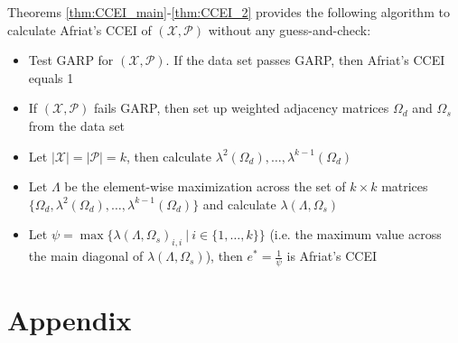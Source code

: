 \documentclass{article} %
\theoremstyle{style1}
\theoremstyle{style1}
\theoremstyle{example}
\begin{document}
Theorems \ref{thm:CCEI_main}-\ref{thm:CCEI_2} provides the following algorithm to calculate Afriat's CCEI of $(\mathcal{X},\mathcal{P})$ without any guess-and-check:
\begin{itemize}
  \item Test GARP for $(\mathcal{X},\mathcal{P})$. If the data set passes GARP, then Afriat's CCEI equals 1
  \item If $(\mathcal{X},\mathcal{P})$ fails GARP, then set up weighted adjacency matrices $\Omega_d$ and $\Omega_s$ from the data set
  \item Let $|\mathcal{X}|=|\mathcal{P}|=k$, then calculate $\lambda^2(\Omega_d),\ldots,\lambda^{k-1}(\Omega_d)$
  \item Let $\Lambda$ be the element-wise maximization across the set of $k\times k$ matrices $\{\Omega_d,\lambda^2(\Omega_d),\ldots,\lambda^{k-1}(\Omega_d)\}$ and calculate $\lambda(\Lambda,\Omega_s)$
  \item Let $\psi = \max\big\{\lambda(\Lambda,\Omega_s)_{i,i}\ |\ i\in\{1,\ldots,k\}\big\}$ (i.e. the maximum value across the main diagonal of $\lambda(\Lambda,\Omega_s)$), then $e^*=\frac{1}{\psi}$ is Afriat's CCEI
\end{itemize}



\section{Appendix}
\WGARP*
\end{document}
